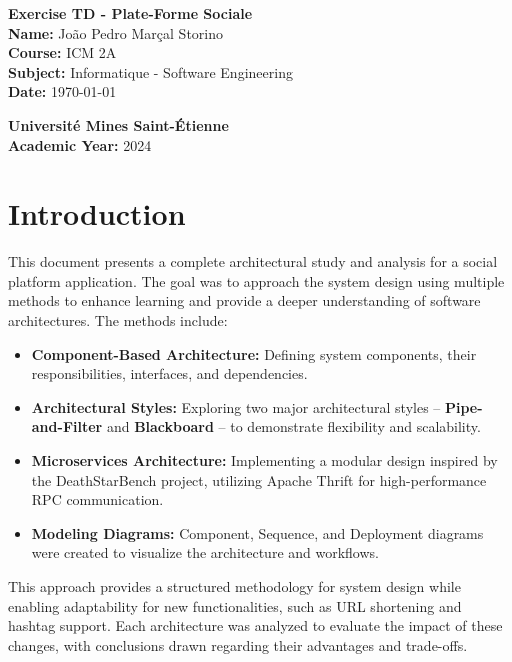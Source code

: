 \documentclass[a4paper,12pt]{article}
\begin{document}
\begin{titlepage}
    \centering
    {\LARGE \textbf{Exercise TD - Plate-Forme Sociale}}\\[1.5cm]
    
    \textbf{Name:} João Pedro Marçal Storino \\[0.5cm]
    \textbf{Course:} ICM 2A \\[0.5cm]
    \textbf{Subject:} Informatique - Software Engineering \\[0.5cm]
    \textbf{Date:} \today \\[2cm]
    
    \vfill
    
    \textbf{Université Mines Saint-Étienne} \\[0.5cm]
    \textbf{Academic Year:} 2024
\end{titlepage}

\newpage
\tableofcontents
\newpage

\section*{Introduction}

This document presents a complete architectural study and analysis for a social platform application. The goal was to approach the system design using multiple methods to enhance learning and provide a deeper understanding of software architectures. The methods include:

\begin{itemize}
    \item \textbf{Component-Based Architecture:} Defining system components, their responsibilities, interfaces, and dependencies.
    \item \textbf{Architectural Styles:} Exploring two major architectural styles – \textbf{Pipe-and-Filter} and \textbf{Blackboard} – to demonstrate flexibility and scalability.
    \item \textbf{Microservices Architecture:} Implementing a modular design inspired by the DeathStarBench project, utilizing Apache Thrift for high-performance RPC communication.
    \item \textbf{Modeling Diagrams:} Component, Sequence, and Deployment diagrams were created to visualize the architecture and workflows.
\end{itemize}

This approach provides a structured methodology for system design while enabling adaptability for new functionalities, such as URL shortening and hashtag support. Each architecture was analyzed to evaluate the impact of these changes, with conclusions drawn regarding their advantages and trade-offs.
\end{document}

